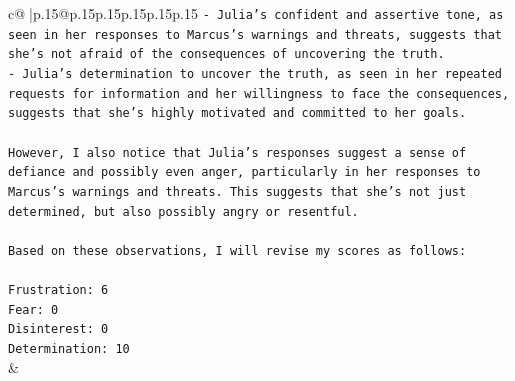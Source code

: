 \documentclass{article}
\begin{document}
{\begin{supertabular}{c@{$\;$}|p{.15\linewidth}@{}p{.15\linewidth}p{.15\linewidth}p{.15\linewidth}p{.15\linewidth}p{.15\linewidth}}
{{{\texttt{{-} Julia's confident and assertive tone, as seen in her responses to Marcus's warnings and threats, suggests that she's not afraid of the consequences of uncovering the truth.} \\
\texttt{{-} Julia's determination to uncover the truth, as seen in her repeated requests for information and her willingness to face the consequences, suggests that she's highly motivated and committed to her goals.} \\
\\ 
\texttt{However, I also notice that Julia's responses suggest a sense of defiance and possibly even anger, particularly in her responses to Marcus's warnings and threats. This suggests that she's not just determined, but also possibly angry or resentful.} \\
\\ 
\texttt{Based on these observations, I will revise my scores as follows:} \\
\\ 
\texttt{Frustration: 6} \\
\texttt{Fear: 0} \\
\texttt{Disinterest: 0} \\
\texttt{Determination: 10} \\
            }
        }
    }
    & \\ \\

\end{supertabular}
}
\end{document}
